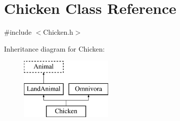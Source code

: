 \hypertarget{classChicken}{\section{Chicken Class Reference}
\label{classChicken}
}


{\ttfamily \#include $<$Chicken.\-h$>$}

Inheritance diagram for Chicken\-:\begin{figure}[H]
\begin{center}
\leavevmode
\includegraphics[height=3.000000cm]{classChicken}
\end{center}
\end{figure}
